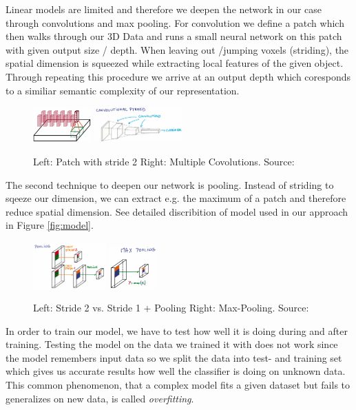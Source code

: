 \documentclass[10pt,twocolumn,letterpaper]{article}
\begin{document}
Linear models are limited and therefore we deepen the network in our case through convolutions and max pooling.
For convolution we define a patch which then walks through our 3D Data and runs a small neural network on this patch with given output size / depth. When leaving out /jumping voxels (striding), the spatial dimension is squeezed while extracting local features of the given object. 
Through repeating this procedure we arrive at an output depth which coresponds to a similiar semantic complexity of our representation. 

\begin{figure}[h]
	\label{fig:convolution}
	\includegraphics[width=0.2\textwidth]{figures/conv}
	\includegraphics[width=0.3\textwidth]{figures/pyra}
	\caption{Left: Patch with stride 2 \quad Right: Multiple Covolutions. Source: \cite{udacity}}
\end{figure}

The second technique to deepen our network is pooling. Instead of striding to sqeeze our dimension, we can extract e.g. the maximum of a patch and therefore reduce spatial dimension. See detailed discribition of model used in our approach in Figure \ref{fig:model}.

\begin{figure}[h]
	\label{fig:pooling}
	\includegraphics[width=0.25\textwidth]{figures/con_max}
	\includegraphics[width=0.16\textwidth]{figures/max}
	\caption{Left: Stride 2 vs. Stride 1 + Pooling \quad Right: Max-Pooling. Source: \cite{udacity}}
\end{figure}

In order to train our model, we have to test how well it is doing during and after training. 
Testing the model on the data we trained it with does not work since the model remembers input data so we split the data into test- and training set which gives us accurate results how well the classifier is doing on unknown data. This common phenomenon, that a complex model fits a given dataset but fails to generalizes on new data, is called \textit{overfitting}.
\end{document}
